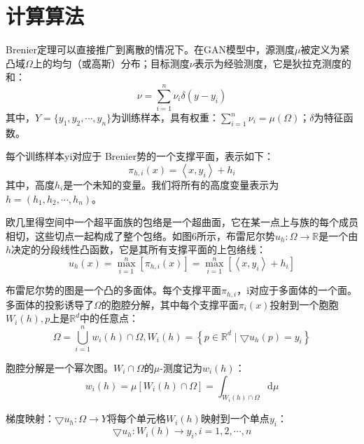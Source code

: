 
\section{计算算法}

 Brenier定理可以直接推广到离散的情况下。在GAN模型中，源测度$\mu$被定义为紧凸域$\Omega$上的均匀（或高斯）分布；目标测度$\nu$表示为经验测度，它是狄拉克测度的和：
\begin{equation}
	\nu = \sum_{i=1}^{n} \nu _i \delta (y-y_i)
	\label{function:17}
\end{equation}
其中，$Y=\{ y_1, y_2, \cdots, y_n \}$为训练样本，具有权重：$\sum_{i=1}^{n} \nu _i=\mu(\Omega)$；$\delta$为特征函数。

每个训练样本yi对应于 Brenier势的一个支撑平面，表示如下：
\begin{equation}
	\pi _{h,i} (x) =\left \langle x , y_i \right \rangle +h_i 
	\label{function:18}
\end{equation}
其中，高度$h_i$是一个未知的变量。我们将所有的高度变量表示为$h=(h_1,h_2,\cdots ,h_n)$。

欧几里得空间中一个超平面族的包络是一个超曲面，它在某一点上与族的每个成员相切，这些切点一起构成了整个包络。如图6所示，布雷尼尔势$u_h : \Omega \to \mathbb{R}$是一个由$h$决定的分段线性凸函数，它是其所有支撑平面的上包络线：
\begin{equation}
	u_h(x)=\max_{i=1}^{n}\left [ \pi _{h,i}(x) \right ] =\max_{i=1}^{n}\left [ \left \langle x,y_i \right \rangle +h_i \right ]
	\label{function:19}
\end{equation}

布雷尼尔势的图是一个凸的多面体。每个支撑平面$\pi_{h,i}$，i对应于多面体的一个面。多面体的投影诱导了$\Omega$的胞腔分解，其中每个支撑平面$\pi _i(x)$投射到一个胞胞$W_i(h),p$上是$\mathbb{R}^d$中的任意点：
\begin{equation}
	\Omega=\bigcup_{i=1}^{n} w_i(h) \cap \Omega, W_i(h)=\left \{ p \in \mathbb{R}^d \mid \bigtriangledown  u_h(p)=y_i \right \}  
	\label{function:20}
\end{equation}

胞腔分解是一个幂次图。$W_i \cap \Omega$的$\mu$-测度记为$w_i(h)$：
\begin{equation}
	w_i(h)=\mu\left [ W_i(h) \cap \Omega \right ] = \int _{W_i(h) \cap \Omega}\mathrm{d}\mu  
	\label{function:21}
\end{equation}

梯度映射：$\bigtriangledown u_h : \Omega \to Y$将每个单元格$W_i(h)$映射到一个单点$y_i$：
\begin{equation}
	\bigtriangledown u_h : W_i(h) \to y_i, i=1,2, \cdots ,n 
	\label{function:22}
\end{equation}

